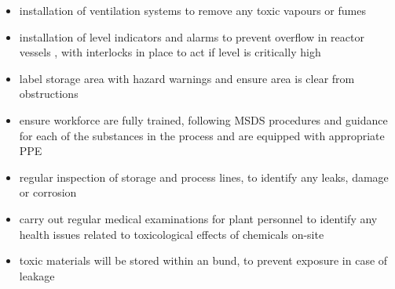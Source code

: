 \begin{itemize}
    \item installation of ventilation systems to remove any toxic vapours or fumes 
    \item installation of level indicators and alarms to prevent overflow in reactor vessels , with interlocks in place to act if level is critically high
    \item label storage area with hazard warnings and ensure area is clear from obstructions
    \item ensure workforce are fully trained, following MSDS procedures and guidance for each of the substances in the process and are equipped with appropriate PPE 
    \item regular inspection of storage and process lines, to identify any leaks, damage or corrosion 
    \item carry out regular medical examinations for plant personnel to identify any health issues related to toxicological effects of chemicals on-site
\item toxic materials will be stored within an bund, to prevent exposure in case of leakage 
\end{itemize}


